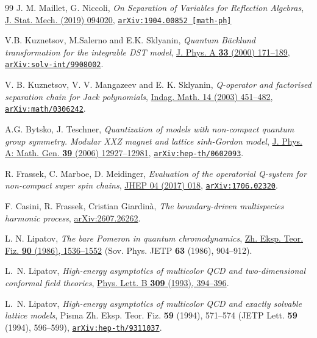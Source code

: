 \documentclass[a4paper,11pt]{article}
\numberwithin{equation}{section}
\begin{document}
\begin{thebibliography}{99}
J. M. Maillet, G. Niccoli,
\textit{On Separation of Variables for Reflection Algebras},
\href{https://doi.org/10.1088/1742-5468/ab357a}{J. Stat. Mech. (2019) 094020},
\href{https://doi.org/10.48550/arXiv.1904.00852}{\tt \href{https://arxiv.org/abs/1904.00852}{\texttt{arXiv:1904.00852}} [math-ph]}


V.B. Kuznetsov, M.Salerno and E.K. Sklyanin,
\textit{Quantum B\"acklund transformation for the integrable DST model},
\href{https://doi.org/10.1088/0305-4470/33/1/311}{J. Phys. A \textbf{33} (2000) 171--189}, \href{https://arxiv.org/abs/solv-int/9908002}{\texttt{arXiv:solv-int/9908002}}.

V. B. Kuznetsov, V. V. Mangazeev and E. K. Sklyanin,
\textit{Q-operator and factorised separation chain for Jack polynomials},
\href{https://doi.org/10.1016/S0019-3577(03)00052-8}{Indag. Math. 14 (2003) 451--482},
\href{https://arxiv.org/abs/math/0306242}{\tt arXiv:math/0306242}.

A.G. Bytsko, J. Teschner,
\textit{Quantization of models with non-compact quantum group symmetry. Modular XXZ magnet and lattice sinh-Gordon model},
\href{https://doi.org/10.1088/0305-4470/39/41/009}{J. Phys. A: Math. Gen. \textbf{39} (2006) 12927--12981},
\href{https://arxiv.org/abs/hep-th/0602093}{\tt arXiv:hep-th/0602093}.

R. Frassek, C. Marboe, D. Meidinger,
\textit{Evaluation of the operatorial Q-system for non-compact super spin chains},
\href{https://doi.org/10.1007/JHEP04(2017)018}{JHEP 04 (2017) 018},
\href{https://arxiv.org/abs/1706.02320}{\tt arXiv:1706.02320}.


F. Casini, R. Frassek, Cristian Giardin\`a, \textit{The boundary-driven multispecies harmonic process}, \href{https://arxiv.org/abs/2607.26262v1}{arXiv:2607.26262}.


L. N. Lipatov, {\em The bare Pomeron in quantum chromodynamics},
\href{http://www.jetp.ras.ru/cgi-bin/e/index/e/63/5/p904?a=list}{Zh. Eksp. Teor. Fiz. {\bf 90} (1986), 1536--1552}
(Sov. Phys. JETP {\bf 63} (1986), 904--912).

L.~N. Lipatov, {\em High-energy asymptotics of multicolor QCD and two-dimensional conformal field theories},
\href{https://www.sciencedirect.com/science/article/abs/pii/037026939390951D?via%3Dihub}{Phys. Lett. B {\bf 309} (1993), 394--396}.

L.~N. Lipatov,
{\em High-energy asymptotics of multicolor QCD and exactly solvable lattice models},
Pisma Zh. Eksp. Teor. Fiz. {\bf 59} (1994),
571--574 (JETP Lett. {\bf 59} (1994), 596--599),
\href{https://arxiv.org/abs/hep-th/9311037}{\tt \href{https://arxiv.org/abs/hep-th/9311037}{\texttt{arXiv:hep-th/9311037}}}.


\end{thebibliography}
\end{document}
